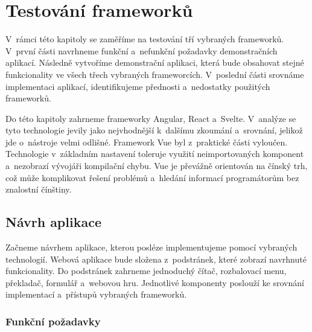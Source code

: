 \section{Testování frameworků}

V~rámci této kapitoly se zaměříme na testování tří vybraných frameworků. V~první části navrhneme funkční a~nefunkční požadavky demonstračních aplikací. 
Následně vytvoříme demonstrační aplikaci, která bude obsahovat stejné funkcionality ve všech třech vybraných frameworcích. 
V~poslední části srovnáme implementaci aplikací, identifikujeme přednosti a~nedostatky použitých frameworků.

Do této kapitoly zahrneme frameworky Angular, React a~Svelte. V~analýze se tyto technologie jevily jako nejvhodnější k~dalšímu zkoumání a~srovnání, jelikož jde o~nástroje velmi odlišné. 
Framework Vue byl z~praktické části vyloučen. Technologie v~základním nastavení toleruje využití neimportovaných komponent a~nezobrazí vývojáři kompilační chybu. 
Vue je převážně orientován na čínský trh, což může komplikovat řešení problémů a~hledání informací programátorům bez znalostní čínštiny.

\subsection{Návrh aplikace}

Začneme návrhem aplikace, kterou posléze implementujeme pomocí vybraných technologií. 
Webová aplikace bude složena z~podstránek, které zobrazí navrhnuté funkcionality. 
Do podstránek zahrneme jednoduchý čítač, rozbalovací menu, překladač, formulář a~webovou hru. 
Jednotlivé komponenty poslouží ke srovnání implementací a~přístupů vybraných frameworků.

\subsubsection{Funkční požadavky}

